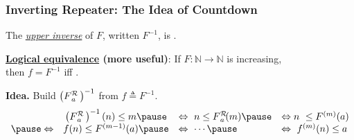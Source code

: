 \begin{frame}
\frametitle{Inverting Repeater: The Idea of Countdown}

The \href{https://github.com/inv-ack/inv-ack/blob/7270e64a2600b771f2b1b1b151f7d13fb2ae6c97/inverse.v\#L28-L45}{
	\emph{upper inverse}} of $F$, written $F^{-1}$,
is .

\smallskip

\pause 
\textbf{\href{https://github.com/inv-ack/inv-ack/blob/7270e64a2600b771f2b1b1b151f7d13fb2ae6c97/inverse.v\#L65-L77}{Logical equivalence} (more useful)}: If $F:\mathbb{N}\to \mathbb{N}$ is increasing, \\
then $f = F^{-1}$ iff .

\bigskip

\textbf{Idea.} Build $\left(\rf{F}{a}\ \right)^{-1}$ from $f \triangleq F^{-1}$.
	\begin{equation*}
	\displayindent0pt
	\displaywidth\textwidth
	\begin{array}{ccll}
	& \left(\rf{F}{a}\ \right)^{-1}(n)\le m \pause & \iff \ n \le \rf{F}{a}(m) \pause & \iff n \ \le F^{(m)}(a) \\
  \pause \iff & f(n)\le F^{(m-1)}(a) \pause & \iff \ \cdots \pause &
	\iff \ f^{(m)}(n) \le a 
	\end{array}
	\end{equation*}

\pause
{}


\end{frame}




